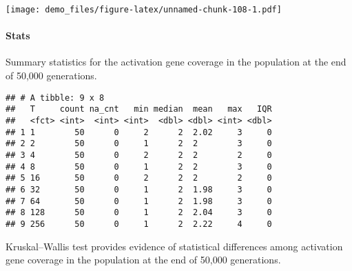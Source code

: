 \documentclass[]{book}
\newenvironment{Shaded}{\begin{snugshade}}{\end{snugshade}}
\newcommand{\DataTypeTok}[1]{\textcolor[rgb]{0.13,0.29,0.53}{#1}}
\newcommand{\KeywordTok}[1]{\textcolor[rgb]{0.13,0.29,0.53}{\textbf{#1}}}
\newcommand{\NormalTok}[1]{#1}
\newcommand{\OperatorTok}[1]{\textcolor[rgb]{0.81,0.36,0.00}{\textbf{#1}}}
\newcommand{\OtherTok}[1]{\textcolor[rgb]{0.56,0.35,0.01}{#1}}
\newcommand{\StringTok}[1]{\textcolor[rgb]{0.31,0.60,0.02}{#1}}
\let\oldparagraph\paragraph
\renewcommand{\paragraph}[1]{\oldparagraph{#1}\mbox{}}
\begin{document}
\texttt{[image: demo\_files/figure-latex/unnamed-chunk-108-1.pdf]}

\hypertarget{stats-20}{%
\paragraph{Stats}\label{stats-20}}

Summary statistics for the activation gene coverage in the population at the end of 50,000 generations.

\begin{Shaded}
\end{Shaded}

\begin{verbatim}
## # A tibble: 9 x 8
##   T     count na_cnt   min median  mean   max   IQR
##   <fct> <int>  <int> <int>  <dbl> <dbl> <int> <dbl>
## 1 1        50      0     2      2  2.02     3     0
## 2 2        50      0     1      2  2        3     0
## 3 4        50      0     2      2  2        2     0
## 4 8        50      0     1      2  2        3     0
## 5 16       50      0     2      2  2        2     0
## 6 32       50      0     1      2  1.98     3     0
## 7 64       50      0     1      2  1.98     3     0
## 8 128      50      0     1      2  2.04     3     0
## 9 256      50      0     1      2  2.22     4     0
\end{verbatim}

Kruskal--Wallis test provides evidence of statistical differences among activation gene coverage in the population at the end of 50,000 generations.
\end{document}
